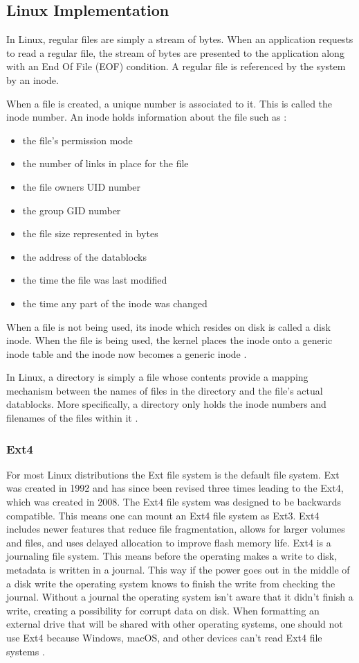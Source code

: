\documentclass[onecolumn,draftclsnofoot, 10pt, compsoc]{IEEEtran}
\begin{document}
	\subsection{Linux Implementation}
		In Linux, regular files are simply a stream of bytes.
		When an application requests to read a regular file, the stream of bytes are presented to the application along with an End Of File (EOF) condition.
		A regular file is referenced by the system by an inode.
		
		When a file is created, a unique number is associated to it.
		This is called the inode number.
		An inode holds information about the file such as \cite{llinuxInodeContents}:
		\begin{itemize}
			\item the file's permission mode
			\item the number of links in place for the file
			\item the file owners UID number
			\item the group GID number
			\item the file size represented in bytes
			\item the address of the datablocks
			\item the time the file was last modified
			\item the time any part of the inode was changed
		\end{itemize}
		
		When a file is not being used, its inode which resides on disk is called a disk inode.
		When the file is being used, the kernel places the inode onto a generic inode table and the inode now becomes a generic inode \cite{llinuxFiles}.
		
		In Linux, a directory is simply a file whose contents provide a mapping mechanism between the names of files in the directory and the file's actual datablocks.
		More specifically, a directory only holds the inode numbers and filenames of the files within it \cite{llinuxFiles}.

		\subsubsection{Ext4}
			For most Linux distributions the Ext file system is the default file system.
			Ext was created in 1992 and has since been revised three times leading to the Ext4, which was created in 2008.
			The Ext4 file system was designed to be backwards compatible. This means one can mount an Ext4 file system as Ext3.
			Ext4 includes newer features that reduce file fragmentation, allows for larger volumes and files, and uses delayed allocation to improve flash memory life.
			Ext4 is a journaling file system.
			This means before the operating makes a write to disk, metadata is written in a journal.
			This way if the power goes out in the middle of a disk write the operating system knows to finish the write from checking the journal.
			Without a journal the operating system isn't aware that it didn't finish a write, creating a possibility for corrupt data on disk. 
			When formatting an external drive that will be shared with other operating systems, one should not use Ext4 because Windows, macOS, and other devices can’t read Ext4 file systems \cite{llinuxEXT4}.
\end{document}

